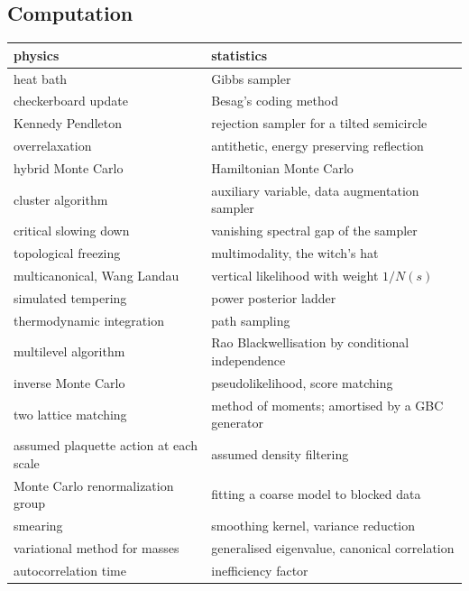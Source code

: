 \subsection{Computation}
\begin{center}
\small
\begin{tabular}{p{1.95in}p{2.2in}}
\toprule
physics & statistics \\ \midrule
heat bath & Gibbs sampler \\
checkerboard update & Besag's coding method \\
Kennedy Pendleton & rejection sampler for a tilted semicircle \\
overrelaxation & antithetic, energy preserving reflection \\
hybrid Monte Carlo & Hamiltonian Monte Carlo \\
cluster algorithm & auxiliary variable, data augmentation sampler \\
critical slowing down & vanishing spectral gap of the sampler \\
topological freezing & multimodality, the witch's hat \\
multicanonical, Wang Landau & vertical likelihood with weight $1/N(s)$ \\
simulated tempering & power posterior ladder \\
thermodynamic integration & path sampling \\
multilevel algorithm & Rao Blackwellisation by conditional independence \\
inverse Monte Carlo & pseudolikelihood, score matching \\
two lattice matching & method of moments; amortised by a GBC generator \\
assumed plaquette action at each scale & assumed density filtering \\
Monte Carlo renormalization group & fitting a coarse model to blocked data \\
smearing & smoothing kernel, variance reduction \\
variational method for masses & generalised eigenvalue, canonical correlation \\
autocorrelation time & inefficiency factor \\
\bottomrule
\end{tabular}
\end{center}

